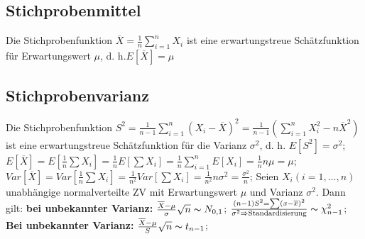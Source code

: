 \subsection{Stichprobenmittel}
Die Stichprobenfunktion $ \overline{X} = \frac{1}{n} \sum_{i=1}^{n} X_{i} $ ist eine erwartungstreue Schätzfunktion für Erwartungswert $ \mu $, d. h.$E[\overline{X}] = \mu$
\subsection{Stichprobenvarianz}
Die Stichprobenfunktion $ S^2 = \frac{1}{n-1} \sum_{i=1}^{n} (X_{i} - \overline{X})^2 = \frac{1}{n-1}(\sum_{i=1}^{n}X_{i}^2 - n\overline{X}^2)$ist eine erwartungstreue Schätzfunktion für die Varianz $\sigma^2$, d. h. $E[S^2] =\sigma^2$; 
$ E[\overline{X}] = E[\frac{1}{n}\sum X_{i}] = \frac{1}{n} E[\sum X_{i}] = \frac{1}{n} \sum_{i=1}^{n} E[X_{i}] = \frac{1}{n} n\mu = \mu$; 
$ Var[\overline{X}] = Var[\frac{1}{n}\sum X_{i}] = \frac{1}{n^2} Var[\sum X_{i}] = \frac{1}{n^2}n\sigma^2 = \frac{\sigma^2}{n} $; 
Seien $ X_{i} (i=1, ..., n)$ unabhängige normalverteilte ZV mit Erwartungswert $\mu$ und Varianz $\sigma^2$. Dann gilt:
\textbf{bei unbekannter Varianz:} $ \frac{\overline{X} -\mu}{\sigma} \sqrt{n} \thicksim N_{0,1}$; 
$ \frac{(n-1)S^2 = \sum(x-\overline{x})^2}{\sigma^2 \Rightarrow \text{Standardisierung}} \thicksim \chi_{n-1}^{2}$; 
\textbf{Bei unbekannter Varianz:} $ \frac{\overline{X}-\mu}{S}\sqrt{n} \thicksim t_{n-1}$; 